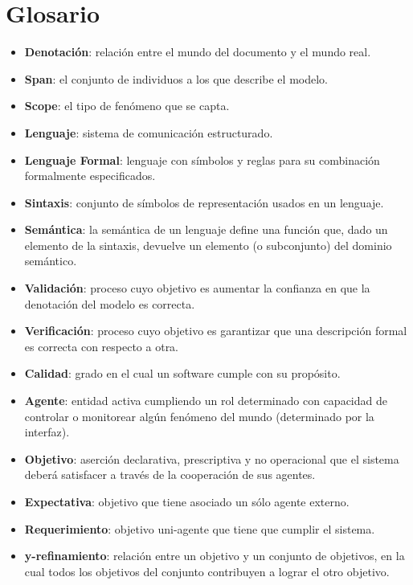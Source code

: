 \documentclass[]{article}
\begin{document}
\section{Glosario}
\begin{itemize}
	\item \textbf{Denotación}: relación entre el mundo del documento y el mundo real.
	\item \textbf{Span}: el conjunto de individuos a los que describe el modelo.
	\item \textbf{Scope}: el tipo de fenómeno que se capta.
	\item \textbf{Lenguaje}: sistema de comunicación estructurado.
	\item \textbf{Lenguaje Formal}: lenguaje con símbolos y reglas para su combinación formalmente especificados.
	\item \textbf{Sintaxis}: conjunto de símbolos de representación usados en un lenguaje.
	\item \textbf{Semántica}: la semántica de un lenguaje define una función que, dado un elemento de la sintaxis, devuelve un elemento (o subconjunto) del dominio semántico.
	\item \textbf{Validación}: proceso cuyo objetivo es aumentar la confianza en que la denotación del modelo es correcta.
	\item \textbf{Verificación}: proceso cuyo objetivo es garantizar que una descripción formal es correcta con respecto a otra.
	\item \textbf{Calidad}: grado en el cual un software cumple con su propósito.
	\item \textbf{Agente}: entidad activa cumpliendo un rol determinado con capacidad de controlar o monitorear algún fenómeno del mundo (determinado por la interfaz).
	\item \textbf{Objetivo}: aserción declarativa, prescriptiva y no operacional que el sistema deberá satisfacer a través de la cooperación de sus agentes.
	\item \textbf{Expectativa}: objetivo que tiene asociado un sólo agente externo.
	\item \textbf{Requerimiento}: objetivo uni-agente que tiene que cumplir el sistema.
	\item \textbf{y-refinamiento}: relación entre un objetivo y un conjunto de objetivos, en la cual todos los objetivos del conjunto contribuyen a lograr el otro objetivo.

\end{itemize}
\end{document}
